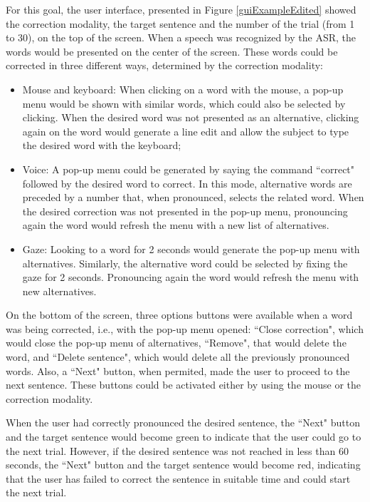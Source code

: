 \documentclass[]{article}
\begin{document}
For this goal, the user interface, presented in Figure \ref{guiExampleEdited} showed the correction modality, the target sentence and the number of the trial (from 1 to 30), on the top of the screen. When a speech was recognized by the ASR, the words would be presented on the center of the screen. These words could be corrected in three different ways, determined by the correction modality:
\begin{itemize}
  \item Mouse and keyboard: When clicking on a word with the mouse, a pop-up menu would be shown with similar words, which could also be selected by clicking. When the desired word was not presented as an alternative, clicking again on the word would generate a line edit and allow the subject to type the desired word with the keyboard;
  \item Voice: A pop-up menu could be generated by saying the command ``correct" followed by the desired word to correct. In this mode, alternative words are preceded by a number that, when pronounced, selects the related word. When the desired correction was not presented in the pop-up menu, pronouncing again the word would refresh the menu with a new list of alternatives.
  \item Gaze: Looking to a word for 2 seconds would generate the pop-up menu with alternatives. Similarly, the alternative word could be selected by fixing the gaze for 2 seconds. Pronouncing again the word would refresh the menu with new alternatives.
\end{itemize}


On the bottom of the screen, three options buttons were available when a word was being corrected, i.e., with the pop-up menu opened: ``Close correction", which would close the pop-up menu of alternatives, ``Remove", that would delete the word, and ``Delete sentence", which would delete all the previously pronounced words. Also, a ``Next" button, when permited, made the user to proceed to the next sentence. These buttons could be activated either by using the mouse or the correction modality.


When the user had correctly pronounced the desired sentence, the ``Next" button and the target sentence would become green to indicate that the user could go to the next trial. However, if the desired sentence was not reached in less than 60 seconds, the ``Next" button and the target sentence would become red, indicating that the user has failed to correct the sentence in suitable time and could start the next trial.
\end{document}

